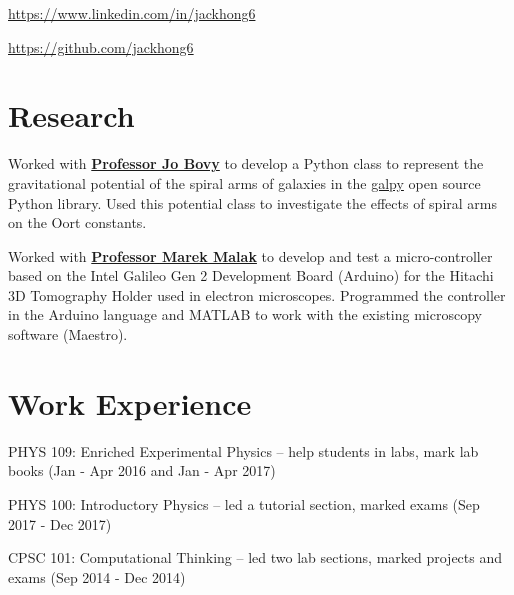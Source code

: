 \documentclass[]{deedy-resume-openfont}
\begin{document}
\lastupdated


\href{https://www.linkedin.com/in/jackhong6}{https://www.linkedin.com/in/jackhong6}

\href{https://github.com/jackhong6}{https://github.com/jackhong6}

\section{Research}
Worked with \textbf{\href{http://astro.utoronto.ca/~bovy/}{Professor Jo Bovy}} to develop a Python class to represent the gravitational potential of the spiral arms of galaxies in the \textsf{\href{https://github.com/jobovy/galpy}{galpy}} open source Python library. Used this potential class to investigate the effects of spiral arms on the Oort constants.
\sectionsep

Worked with \textbf{\href{https://sites.google.com/site/temsemeels/marek-malac}{Professor Marek Malak}} to develop and test a micro-controller based on the Intel Galileo Gen 2 Development Board (Arduino) for the Hitachi 3D Tomography Holder used in electron microscopes. Programmed the controller in the Arduino language and MATLAB to work with the existing microscopy software (Maestro).
\sectionsep

\section{Work Experience}
\begin{tightemize}
\item PHYS 109: Enriched Experimental Physics – help students in labs, mark lab books (Jan - Apr 2016 and Jan - Apr 2017)
\item PHYS 100: Introductory Physics – led a tutorial section, marked exams (Sep 2017 - Dec 2017)
\item CPSC 101: Computational Thinking – led two lab sections, marked projects and exams (Sep 2014 - Dec 2014) 
\end{tightemize}
\sectionsep
\end{document}
